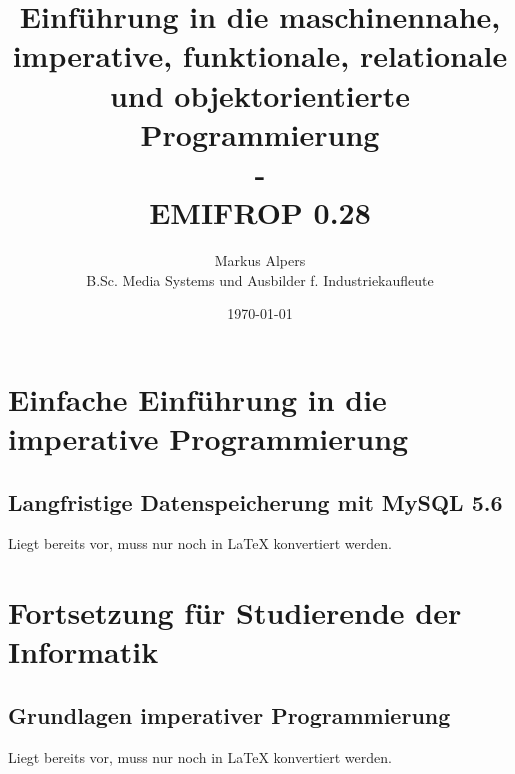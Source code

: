 \documentclass[11pt, a4paper, oneside, draft]{book}
\begin{document}

\title{Einführung in die maschinennahe, imperative, funktionale, relationale und objektorientierte Programmierung\\-\\EMIFROP 0.28}
\author{Markus Alpers\\B.Sc. Media Systems und Ausbilder f. Industriekaufleute}
\date{\today}

\maketitle


\tableofcontents




\part{Einfache Einführung in die imperative Programmierung}











%

\chapter{Langfristige Datenspeicherung mit MySQL 5.6}
Liegt bereits vor, muss \glqq{}nur\grqq{} noch in LaTeX konvertiert werden.

\part{Fortsetzung für Studierende der Informatik}



%

\chapter{Grundlagen imperativer Programmierung}
Liegt bereits vor, muss \glqq{}nur\grqq{} noch in LaTeX konvertiert werden.
\end{document}
